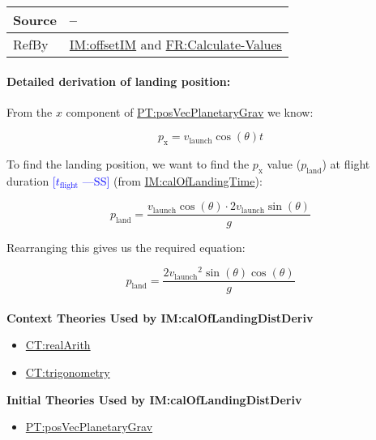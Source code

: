 \documentclass[12pt]{article}
\newcommand{\authornote}[3]{\textcolor{#1}{[#3 ---#2]}}
\newcommand{\authornote}[3]{}
\newcommand{\wss}[1]{\authornote{blue}{SS}{#1}}
\begin{document}
\begin{minipage}{\textwidth}
\begin{tabular}{>{\raggedright}p{}>{\raggedright\arraybackslash}p{}}
\\ \midrule
Source & --
         
\\ \midrule
RefBy & \hyperref[IM:offsetIM]{IM:offsetIM} and \hyperref[calcValues]{FR:Calculate-Values}
        
\\ \bottomrule
\end{tabular}
\end{minipage}

\paragraph{Detailed derivation of landing position:}
\label{IM:calOfLandingDistDeriv}

From the $x$ component of \hyperref[PT:posVecPlanetaryGrav]{PT:posVecPlanetaryGrav} we know:

\begin{displaymath}
p_\text{x} = v_\text{launch} \cos (\theta) t
\end{displaymath}

To find the landing position, we want to find the ${p_{\text{x}}}$ value
(${p_{\text{land}}}$) at flight duration \wss{$t_\text{flight}$} (from
\hyperref[IM:calOfLandingTime]{IM:calOfLandingTime}):

\begin{displaymath}
{p_{\text{land}}}=\frac{{v_{\text{launch}}} \cos\left(θ\right)\cdot{}2 {v_{\text{launch}}} \sin\left(θ\right)}{g}
\end{displaymath}

Rearranging this gives us the required equation:

\begin{displaymath}
{p_{\text{land}}}=\frac{2 {v_{\text{launch}}}^{2} \sin\left(θ\right) \cos\left(θ\right)}{g}
\end{displaymath}
~\\

\noindent \textbf{Context Theories Used by IM:calOfLandingDistDeriv}

\begin{itemize}
\item \hyperref[CT:realArith]{CT:realArith}
\item \hyperref[CT:trigonometry]{CT:trigonometry}
\end{itemize}

\noindent \textbf{Initial Theories Used by IM:calOfLandingDistDeriv}

\begin{itemize}
\item \hyperref[PT:posVecPlanetaryGrav]{PT:posVecPlanetaryGrav}
\end{itemize}
\end{document}
